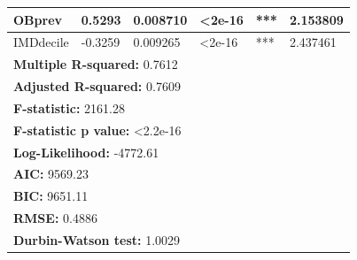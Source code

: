 \begin{table}[]
\begin{tabular}{|llllll|}
\multicolumn{1}{|l|}{OBprev}            & \multicolumn{1}{l|}{0.5293}               & \multicolumn{1}{l|}{0.008710} & \multicolumn{1}{l|}{\textless 2e-16}  & \multicolumn{1}{l|}{***}                   & 2.153809     \\ \hline
\multicolumn{1}{|l|}{IMDdecile}         & \multicolumn{1}{l|}{-0.3259}              & \multicolumn{1}{l|}{0.009265} & \multicolumn{1}{l|}{\textless 2e-16}  & \multicolumn{1}{l|}{***}                   & 2.437461     \\ \hline \hline
\multicolumn{6}{|l|}{\textbf{Multiple R-squared:} 0.7612}                                                                                                                                        \\ \hline
\multicolumn{6}{|l|}{\textbf{Adjusted R-squared:} 0.7609}                                                                                                                                        \\ \hline
\multicolumn{6}{|l|}{\textbf{F-statistic:} 2161.28}                                                                                                                                              \\ \hline
\multicolumn{6}{|l|}{\textbf{F-statistic p value:} \textless 2.2e-16}                                                                                                                            \\ \hline
\multicolumn{6}{|l|}{\textbf{Log-Likelihood:} -4772.61}                                                                                                                                          \\ \hline
\multicolumn{6}{|l|}{\textbf{AIC:} 9569.23}                                                                                                                                                      \\ \hline
\multicolumn{6}{|l|}{\textbf{BIC:} 9651.11}                                                                                                                                                      \\ \hline
\multicolumn{6}{|l|}{\textbf{RMSE:} 0.4886}                                                                                                                                                      \\ \hline \hline
\multicolumn{6}{|l|}{\textbf{Durbin-Watson test:} 1.0029}                                                                                                                                        \\ \hline

\end{tabular}
\end{table}
